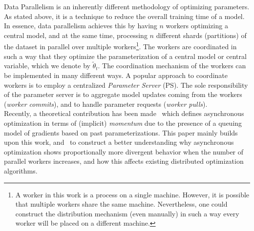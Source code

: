 \documentclass[wcp]{jmlr}
\begin{document}
Data Parallelism is an inherently different methodology of optimizing parameters. As stated above, it is a technique to reduce the overall training time of a model. In essence, data parallelism achieves this by having $n$ workers optimizing a central model, and at the same time, processing $n$ different shards (partitions) of the dataset in parallel over multiple workers\footnote{A worker in this work is a process on a single machine. However, it is possible that multiple workers share the same machine. Nevertheless, one could construct the distribution mechanism (even manually) in such a way every worker will be placed on a different machine.}. The workers are coordinated in such a way that they optimize the parameterization of a central model or central variable, which we denote by $\tilde{\theta}_t$. The coordination mechanism of the workers can be implemented in many different ways. A popular approach to coordinate workers is to employ a centralized \emph{Parameter Server} (PS). The sole responsibility of the parameter server is to aggregate model updates coming from the workers (\emph{worker commits}), and to handle parameter requests (\emph{worker pulls}).\\

Recently, a theoretical contribution has been made~\cite{implicitmomentum} which defines asynchronous optimization in terms of (implicit) \emph{momentum} due to the presence of a queuing model of gradients based on past parameterizations. This paper mainly builds upon this work, and~\cite{zhang2015deep} to construct a better understanding why asynchronous optimization shows proportionally more divergent behavior when the number of parallel workers increases, and how this affects existing distributed optimization algorithms.
\end{document}
